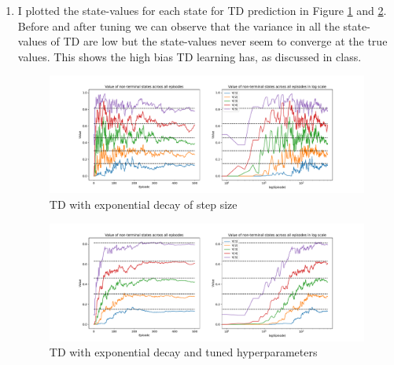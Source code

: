 \begin{enumerate}
    \item I plotted the state-values for each state for TD prediction in Figure \ref{fig:default_td} and \ref{fig:tuned_td}. Before and after tuning we can observe that the variance in all the state-values of TD are low but the state-values never seem to converge at the true values. This shows the high bias TD learning has, as discussed in class.
    \begin{figure}[h]
        \centering
        \includegraphics[width=\textwidth]{images/mc_td/td_learning_exponential_0.5_0.01_episode_values.pdf}
        \caption{TD with exponential decay of step size}
        \label{fig:default_td}
    \end{figure}

    \begin{figure}[h]
        \centering
        \includegraphics[width=\textwidth]{images/mc_td/td_learning_exponential_0.1_0.002_episode_values.pdf}
        \caption{TD with exponential decay and tuned hyperparameters}
        \label{fig:tuned_td}
    \end{figure}


\end{enumerate}
